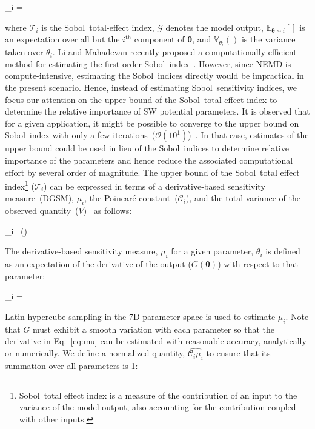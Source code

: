 \be
 _i =  
 \ee
 
 \noindent where $\mathcal{T}_i$ is the Sobol\textquotesingle~total-effect index, $\mathcal{G}$ denotes the model output,
 $\mathbb{E}_{\bm{\theta}\sim i}[]$ is an expectation over all but the $i^{\mbox{th}}$ component of 
 $\bm{\theta}$, and $\mathbb{V}_{\theta_i}()$ is the variance taken over $\theta_i$. Li and Mahadevan
 recently proposed a computationally efficient method for estimating the first-order Sobol\textquotesingle~index~\cite{Li:2016}.
However, since NEMD is compute-intensive,
estimating the Sobol\textquotesingle~indices directly would be impractical in the present scenario. Hence, instead of 
estimating Sobol\textquotesingle~sensitivity
indices, we focus our attention on the upper bound of the Sobol\textquotesingle~total-effect index to determine the relative
importance of SW potential parameters. 
It is observed that for a given application, it might be possible to 
converge to the upper bound on
Sobol\textquotesingle~index with only a few iterations~($\mathcal{O}(10^{1})$)~\cite{Kucherenko:2016}. 
In that case, estimates of the upper bound could be used in lieu of the
Sobol\textquotesingle~indices to determine relative importance of the parameters and hence 
reduce the associated computational
effort by several order of magnitude. The upper bound of the
Sobol\textquotesingle~total effect index\footnote{Sobol\textquotesingle~total effect index is a measure
 of the contribution of an 
input to the variance of the model output, also accounting for the contribution coupled with other inputs.}
($\mathcal{T}_i$) can be expressed in terms of a derivative-based sensitivity measure~(DGSM), $\mu_i$, the Poincar\' e 
constant~($\mathcal{C}_i$), and the total variance of the observed
quantity~($V$)~\cite{Lamboni:2013,Roustant:2014} as follows:   

\be
{}_i \leq {}~(\propto {}) 
\ee 

\noindent The derivative-based sensitivity measure, $\mu_i$ for a given parameter, $\theta_i$ is
defined as an expectation
of the derivative of the output ($G(\bm{\theta})$) with respect to that parameter:

\be
\mu_i = 
\label{eq:mu}
\ee

\noindent Latin hypercube sampling in the 7D parameter space is used to estimate $\mu_i$. Note that $G$ must 
exhibit a smooth variation with each parameter so that the derivative in Eq.~\ref{eq:mu} can be estimated
with reasonable accuracy, analytically or numerically. 
We define a normalized quantity, $\hat{\mathcal{C}_i\mu_i}$ to ensure that its summation over all parameters is 1:


